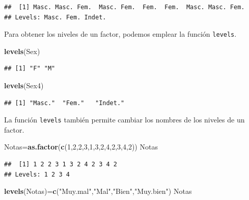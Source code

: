 \documentclass[]{book}
\newenvironment{Shaded}{\begin{snugshade}}{\end{snugshade}}
\newcommand{\DecValTok}[1]{\textcolor[rgb]{0.00,0.00,0.81}{#1}}
\newcommand{\KeywordTok}[1]{\textcolor[rgb]{0.13,0.29,0.53}{\textbf{#1}}}
\newcommand{\NormalTok}[1]{#1}
\newcommand{\StringTok}[1]{\textcolor[rgb]{0.31,0.60,0.02}{#1}}
\theoremstyle{definition}
\theoremstyle{definition}
\theoremstyle{definition}
\theoremstyle{remark}
\begin{document}
\begin{verbatim}
##  [1] Masc. Masc. Fem.  Masc. Fem.  Fem.  Fem.  Masc. Masc. Fem. 
## Levels: Masc. Fem. Indet.
\end{verbatim}

Para obtener los niveles de un factor, podemos emplear la función \texttt{levels}.

\begin{Shaded}
\begin{Highlighting}[]
\KeywordTok{levels}\NormalTok{(Sex)}
\end{Highlighting}
\end{Shaded}

\begin{verbatim}
## [1] "F" "M"
\end{verbatim}

\begin{Shaded}
\begin{Highlighting}[]
\KeywordTok{levels}\NormalTok{(Sex4)}
\end{Highlighting}
\end{Shaded}

\begin{verbatim}
## [1] "Masc."  "Fem."   "Indet."
\end{verbatim}

La función \texttt{levels} también permite cambiar los nombres de los niveles de un factor.

\begin{Shaded}
\begin{Highlighting}[]
\NormalTok{Notas=}\KeywordTok{as.factor}\NormalTok{(}\KeywordTok{c}\NormalTok{(}\DecValTok{1}\NormalTok{,}\DecValTok{2}\NormalTok{,}\DecValTok{2}\NormalTok{,}\DecValTok{3}\NormalTok{,}\DecValTok{1}\NormalTok{,}\DecValTok{3}\NormalTok{,}\DecValTok{2}\NormalTok{,}\DecValTok{4}\NormalTok{,}\DecValTok{2}\NormalTok{,}\DecValTok{3}\NormalTok{,}\DecValTok{4}\NormalTok{,}\DecValTok{2}\NormalTok{))}
\NormalTok{Notas}
\end{Highlighting}
\end{Shaded}

\begin{verbatim}
##  [1] 1 2 2 3 1 3 2 4 2 3 4 2
## Levels: 1 2 3 4
\end{verbatim}

\begin{Shaded}
\begin{Highlighting}[]
\KeywordTok{levels}\NormalTok{(Notas)=}\KeywordTok{c}\NormalTok{(}\StringTok{"Muy.mal"}\NormalTok{,}\StringTok{"Mal"}\NormalTok{,}\StringTok{"Bien"}\NormalTok{,}\StringTok{"Muy.bien"}\NormalTok{)}
\NormalTok{Notas}
\end{Highlighting}
\end{Shaded}
\end{document}
